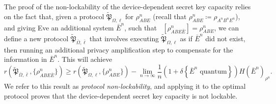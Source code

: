 \documentclass[10pt, a4paper]{article}
\numberwithin{equation}{section} %
\theoremstyle{definition}
\theoremstyle{plain}
\newcommand{\?}{\mathrel{?}} %
\newcommand{\indic}[1]{\delta{\left\{#1\right\}}} %
\newcommand{\Tr}[2][]{\mathop{\mathrm{Tr}#1}\left[ #2 \right]} %
\newcommand{\qproto}[2][\ell]{\tilde{\mathfrak{P}}_{#2, #1}}
\begin{document}
    The proof of the non-lockability of the device-dependent secret key capacity relies on the fact that, given a protocol \(\qproto{\Omega}\) for \(\rho_{ABE}^n\) (recall that \(\rho_{ABE}^n \coloneqq \rho_{A^n B^n E^n}\)), and giving Eve an additional system \(\bar{E}^n\), such that \(\Tr[_{\bar{E}^n}]{\rho_{ABE\bar{E}}^n} = \rho_{ABE}^n\), we can define a new protocol \(\qproto[\bar{\ell}]{\bar{\Omega}}\) that involves executing \(\qproto{\Omega}\) as if \(\bar{E}^n\) did not exist, then running an additional privacy amplification step to compensate for the information in \(\bar{E}^n\). This will achieve~\cite[Thm 5.1]{CQKeyDistill}
    \begin{equation}\label{eqn:protonolock}
      r\left(\qproto[\bar{\ell}]{\bar{\Omega}}, {\{\rho_{ABE\bar{E}}^{n}\}} \right) \geq r\left(\qproto{\Omega}, {\{\rho_{ABE}^{n}\}} \right) - \lim_{n\to\infty} \frac{1}{n}(1+\indic{\bar{E}^n \text{ quantum}})H{(\bar{E}^n)}_{\rho^n}.
    \end{equation}
    We refer to this result as \emph{protocol non-lockability}, and applying it to the optimal protocol proves that the device-dependent secret key capacity is not lockable.
\end{document}

